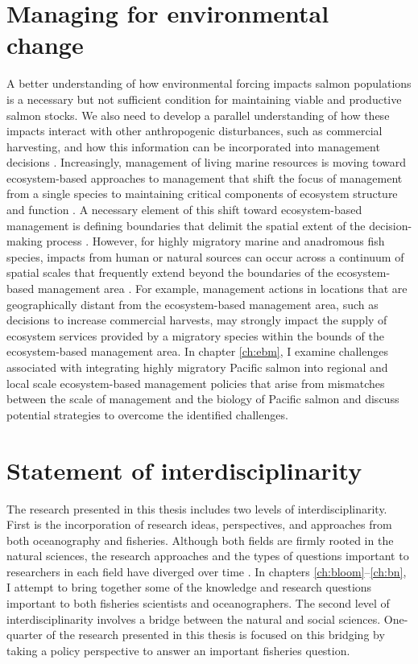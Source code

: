 \section{Managing for environmental change}

A better understanding of how environmental forcing impacts salmon populations
is a necessary but not sufficient condition for maintaining viable and
productive salmon stocks. We also need to develop a parallel understanding of
how these impacts interact with other anthropogenic disturbances, such as
commercial harvesting, and how this information can be incorporated into
management decisions \citep{Link2002a}. Increasingly, management of living
marine resources is moving toward ecosystem-based approaches to management that
shift the focus of management from a single species to maintaining critical
components of ecosystem structure and function \citep{Grumbine1994,
Murawski2007a, Long2015}. A necessary element of this shift toward
ecosystem-based management is defining boundaries that delimit the spatial
extent of the decision-making process \citep{Engler2015, Yaffee1999}. However,
for highly migratory marine and anadromous fish species, impacts from human or
natural sources can occur across a continuum of spatial scales that frequently
extend beyond the boundaries of the ecosystem-based management area
\citep{Dallimer2015}. For example, management actions in locations that are
geographically distant from the ecosystem-based management area, such as
decisions to increase commercial harvests, may strongly impact the supply of
ecosystem services provided by a migratory species within the bounds of the
ecosystem-based management area. In chapter \ref{ch:ebm}, I examine challenges
associated with integrating highly migratory Pacific salmon into regional and
local scale ecosystem-based management policies that arise from mismatches
between the scale of management and the biology of Pacific salmon and discuss
potential strategies to overcome the identified challenges.


\section{Statement of interdisciplinarity}

The research presented in this thesis includes two levels of
interdisciplinarity. First is the incorporation of research ideas, perspectives,
and approaches from both oceanography and fisheries. Although both fields are
firmly rooted in the natural sciences, the research approaches and the types of
questions important to researchers in each field have diverged over time
\citep{Platt2007a}. In chapters \ref{ch:bloom}--\ref{ch:bn}, I attempt to
bring together some of the knowledge and research questions important to both
fisheries scientists and oceanographers. The second level of interdisciplinarity
involves a bridge between the natural and social sciences. One-quarter of the
research presented in this thesis is focused on this bridging by taking a policy
perspective to answer an important fisheries question.


